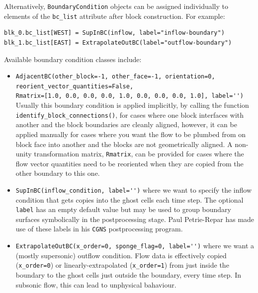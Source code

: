 \medskip
Alternatively, \verb!BoundaryCondition! objects can be assigned individually 
to elements of the \verb!bc_list! attribute after block construction.
For example:
\begin{verbatim}
blk_0.bc_list[WEST] = SupInBC(inflow, label="inflow-boundary")
blk_1.bc_list[EAST] = ExtrapolateOutBC(label="outflow-boundary")
\end{verbatim}

\noindent\medskip
Available boundary condition classes include:
  \begin{itemize}
    \item \verb!AdjacentBC(other_block=-1, other_face=-1, orientation=0,!\\
      \verb!reorient_vector_quantities=False,!\\
      \verb!Rmatrix=[1.0, 0.0, 0.0, 0.0, 1.0, 0.0, 0.0, 0.0, 1.0], label='')!\\
      Usually this boundary condition is applied implicitly, by calling the function\\
      \verb!identify_block_connections()!, for cases where one block interfaces with another
      and the block boundaries are cleanly aligned, however, it can be applied manually for cases where you want 
      the flow to be plumbed from on block face into another and the blocks are not geometrically aligned.
      A non-unity transformation matrix, \verb!Rmatrix!, can be provided for cases where the flow vector quantities need to
      be reoriented when they are copied from the other boundary to this one.
    \item \verb!SupInBC(inflow_condition, label='')! where we want to specify the inflow condition
      that gets copies into the ghost cells each time step.
      The optional \texttt{label} has an empty default value but may be used to group boundary surfaces symbolically
      in the postprocessing stage.
      Paul Petrie-Repar has made use of these labels in his \verb!CGNS! postprocessing program.
    \item \verb!ExtrapolateOutBC(x_order=0, sponge_flag=0, label='')! where we want a (mostly supersonic) outflow
      condition.
      Flow data is effectively copied (\verb!x_order=0!) or linearly-extrapolated (\verb!x_order=1!)
      from just inside the boundary to the ghost cells just outside the boundary, every time step.
      In subsonic flow, this can lead to unphysical bahaviour.

\end{itemize}
